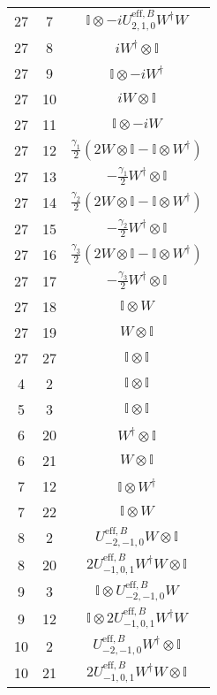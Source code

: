 \begin{longtable}{ccc}
	27 & 7  & \(\mathbb{I} \otimes -iU^{\mathrm{eff},B}_{2,1,0}W^{\dagger}W\) \\
	27 & 8  & \(iW^{\dagger} \otimes \mathbb{I}\) \\
	27 & 9  & \(\mathbb{I} \otimes -iW^{\dagger}\) \\
	27 & 10 & \(iW \otimes \mathbb{I}\) \\
	27 & 11 & \(\mathbb{I} \otimes -iW\) \\
	27 & 12 & \(\frac{\gamma_{1}}{2}\left( 2W \otimes \mathbb{I} - \mathbb{I} \otimes W^{\dagger}\right)\)  \\
	27 & 13 & \(-\frac{\gamma_{1}}{2}W^{\dagger} \otimes \mathbb{I}\)  \\ 
	27 & 14 & \(\frac{\gamma_{2}}{2}\left( 2W \otimes \mathbb{I} - \mathbb{I} \otimes W^{\dagger} \right)\)  \\
	27 & 15 & \(-\frac{\gamma_{2}}{2}W^{\dagger} \otimes \mathbb{I}\)  \\
	27 & 16 & \(\frac{\gamma_{3}}{2}\left( 2W \otimes \mathbb{I} - \mathbb{I} \otimes W^{\dagger} \right)\) \\
	27 & 17 & \(-\frac{\gamma_{3}}{2}W^{\dagger} \otimes \mathbb{I} \)  \\
	27 & 18 & \(\mathbb{I} \otimes W\) \\
	27 & 19 & \(W \otimes \mathbb{I}\) \\
	\hline
	27 & 27 & \(\mathbb{I} \otimes \mathbb{I}\) \\
	\hline
	4  & 2  & \(\mathbb{I} \otimes \mathbb{I}\) \\
	5  & 3  & \(\mathbb{I} \otimes \mathbb{I}\) \\
	6  & 20 & \(W^{\dagger} \otimes \mathbb{I}\) \\
	6  & 21 & \(W \otimes \mathbb{I}\) \\
	7  & 12 & \(\mathbb{I} \otimes W^{\dagger}\) \\
	7  & 22 & \(\mathbb{I} \otimes W\) \\
	8  & 2  & \(U^{\mathrm{eff},B}_{-2,-1,0}W \otimes \mathbb{I}\) \\
	8  & 20 & \(2U^{\mathrm{eff},B}_{-1,0,1}W^{\dagger}W \otimes \mathbb{I}\) \\
	9  & 3  & \(\mathbb{I} \otimes U^{\mathrm{eff},B}_{-2,-1,0}W\) \\
	9  & 12 & \(\mathbb{I} \otimes 2U^{\mathrm{eff},B}_{-1,0,1}W^{\dagger}W\) \\
	10 & 2  & \(U^{\mathrm{eff},B}_{-2,-1,0}W^{\dagger} \otimes \mathbb{I}\) \\
	10 & 21 & \(2U^{\mathrm{eff},B}_{-1,0,1}W^{\dagger}W \otimes \mathbb{I}\) \\

\end{longtable}

